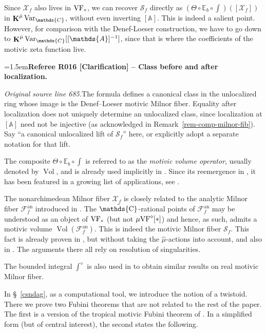 \documentclass[12pt]{amsart}
\newcommand{\RefereeRemark}[4]{%
  \par\medskip\begingroup\normalfont\small\color{RefereePurple}%
  \emergencystretch=1.5em\noindent\textbf{Referee R#1 [#2] -- #3.}\par\nobreak\noindent #4\par
  \endgroup\medskip
}
\newcommand{\memph}[1]{{\color{magenta}\emph{#1}}}
\theoremstyle{plain}
\theoremstyle{definition}
\theoremstyle{remark}
\numberwithin{equation}{section}
\theoremstyle{plain}
\newcommand{\VF}{\textup{VF}}
\newcommand{\A}{\mathds{A}}
\newcommand{\C}{\mathds{C}}
\newcommand{\0}{\emptyset}
\newcommand{\mdl}[1]{\mathcal{#1}}  %
\newcommand{\bb}[1]{\mathbb{#1}}
\newcommand{\mgVF}{{\mu} {\VF}}
\DeclareMathOperator{\ggk}{\mathbf{K}}
\newcommand{\var}{\textup{Var}}
\DeclareMathOperator{\puC}{\tilde \C}
\DeclareMathOperator{\Vol}{Vol}
\newcommand{\gmv}{\ggk^{\hat \mu}\var_{\C}}
\begin{document}
Since $\mdl X_f$ also lives in $\VF_*$, we can recover   $\mathscr S_{f}$ directly as $(\Theta \circ \bb E_b \circ \int)([\mdl X_f])$ in $\gmv$, without even inverting $[\A]$. This is indeed a salient point. However, for comparison with the Denef-Loeser construction, we have to go down to  $\gmv[[\A]^{-1}]$, since that is where the coefficients of the motivic zeta function live.

\RefereeRemark{016}{Clarification}{Class before and after localization}{%
\textit{Original source line 685.}\quad The formula defines a canonical class in the unlocalized ring whose image is the Denef--Loeser motivic Milnor fiber. Equality after localization does not uniquely determine an unlocalized class, since localization at $[\A]$ need not be injective (as acknowledged in Remark~\ref{rem-comp-milnor-fib}). Say ``a canonical unlocalized lift of $\mathscr S_f$'' here, or explicitly adopt a separate notation for that lift.
}

The composite  $\Theta \circ \bb E_b \circ \int$ is referred to as the \memph{motivic volume operator}, usually denoted by $\Vol$, and is already used implicitly in \cite{hrushovski:kazhdan:integration:vf}. Since its reemergence in \cite{hru:loe:lef}, it has been featured in a growing list of applications, see \cite{thuong-int-conj, nicaise_ps_tropical, Nic:Pay:trop:fub, forey_virtual_2017, NS-deg-stab-rat}.

The nonarchimedean Milnor fiber $\mdl X_f$ is closely related to the analytic Milnor fiber $\mathcal{F}^{\mathrm{an}}_{f}$ introduced in \cite{nicaise:sebag:motivic:serre}. The $\puC$-rational points of $\mathcal{F}^{\mathrm{an}}_{f}$ may be understood as an object of  $\VF_*$ (but not $\mgVF^\diamond[*]$) and hence, as such, admits a motivic volume $\Vol(\mathcal{F}^{\mathrm{an}}_{f})$. This is indeed the motivic Milnor fiber $\mathscr S_{f}$. This fact is already proven  in \cite{nicaise_ps_tropical}, but without taking the $\hat \mu$-actions into account, and also in \cite{Nic:Pay:trop:fub, forey_virtual_2017}. The arguments there all rely on resolution of singularities.

The bounded integral $\int^\diamond$ is also used in \cite{FY:Mot-Int-Mil-Fib} to obtain similar results on real motivic Milnor fiber.

In \S~\ref{csndag}, as a computational tool, we introduce the notion of a twistoid. There we prove two Fubini theorems that are not related to the rest of the paper. The first is  a version of the  tropical motivic Fubini theorem of \cite{Nic:Pay:trop:fub}. In a  simplified form (but of central interest), the second states the following.
\end{document}
